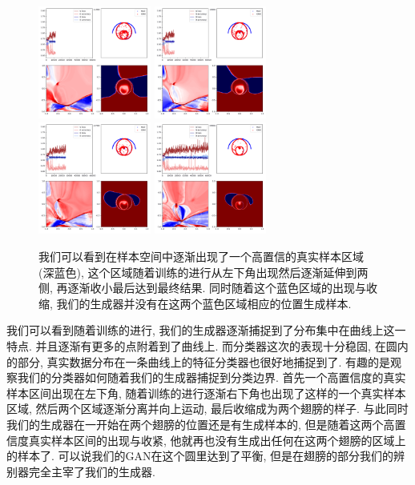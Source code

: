 \documentclass[lang=cn,11pt]{elegantpaper}
\begin{document}
\begin{figure}[hbt]
  \includegraphics[width=0.33\textwidth]{wings_3_5}
  \includegraphics[width=0.33\textwidth]{wings_3_6}\\
  \includegraphics[width=0.33\textwidth]{wings_3_7}
  \includegraphics[width=0.33\textwidth]{wings_3_8}
  \caption{我们可以看到在样本空间中逐渐出现了一个高置信的真实样本区域(深蓝色), 这个区域随着训练的进行从左下角出现然后逐渐延伸到两侧, 再逐渐收小最后达到最终结果. 同时随着这个蓝色区域的出现与收缩, 我们的生成器并没有在这两个蓝色区域相应的位置生成样本.}
\end{figure}

我们可以看到随着训练的进行, 我们的生成器逐渐捕捉到了分布集中在曲线上这一特点. 并且逐渐有更多的点附着到了曲线上. 而分类器这次的表现十分稳固, 在圆内的部分, 真实数据分布在一条曲线上的特征分类器也很好地捕捉到了. 有趣的是观察我们的分类器如何随着我们的生成器捕捉到分类边界. 首先一个高置信度的真实样本区间出现在左下角, 随着训练的进行逐渐右下角也出现了这样的一个真实样本区域, 然后两个区域逐渐分离并向上运动, 最后收缩成为两个翅膀的样子. 与此同时我们的生成器在一开始在两个翅膀的位置还是有生成样本的, 但是随着这两个高置信度真实样本区间的出现与收紧, 他就再也没有生成出任何在这两个翅膀的区域上的样本了. 可以说我们的GAN在这个圆里达到了平衡, 但是在翅膀的部分我们的辨别器完全主宰了我们的生成器. 
\end{document}
